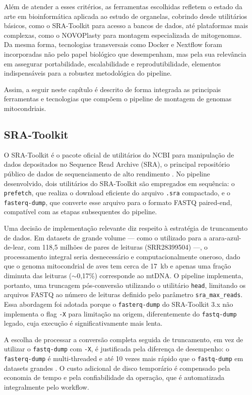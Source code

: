 Além de atender a esses critérios, as ferramentas escolhidas refletem o estado da arte em bioinformática aplicada ao estudo de organelas, cobrindo desde utilitários básicos, como o SRA-Toolkit para acesso a bancos de dados, até plataformas mais complexas, como o NOVOPlasty para montagem especializada de mitogenomas. Da mesma forma, tecnologias transversais como Docker e Nextflow foram incorporadas não pelo papel biológico que desempenham, mas pela sua relevância em assegurar portabilidade, escalabilidade e reprodutibilidade, elementos indispensáveis para a robustez metodológica do pipeline.

Assim, a seguir neste capítulo é descrito de forma integrada as principais ferramentas e tecnologias que compõem o pipeline de montagem de genomas mitocondriais.

\subsection{SRA-Toolkit}

O SRA-Toolkit é o pacote oficial de utilitários do NCBI para manipulação de dados depositados no Sequence Read Archive (SRA), o principal repositório público de dados de sequenciamento de alto rendimento \cite{leinonen2011}. No pipeline desenvolvido, dois utilitários do SRA-Toolkit são empregados em sequência: o \texttt{prefetch}, que realiza o download eficiente do arquivo \texttt{.sra} compactado, e o \texttt{fasterq-dump}, que converte esse arquivo para o formato FASTQ paired-end, compatível com as etapas subsequentes do pipeline.

Uma decisão de implementação relevante diz respeito à estratégia de truncamento de dados. Em datasets de grande volume --- como o utilizado para a arara-azul-de-lear, com 118,5 milhões de pares de leituras (SRR28399504) ---, o processamento integral seria desnecessário e computacionalmente oneroso, dado que o genoma mitocondrial de aves tem cerca de 17~kb e apenas uma fração diminuta das leituras ($\sim$0,17\%) corresponde ao mtDNA. O pipeline implementa, portanto, uma truncagem pós-conversão utilizando o utilitário \texttt{head}, limitando os arquivos FASTQ ao número de leituras definido pelo parâmetro \texttt{sra\_max\_reads}. Essa abordagem foi adotada porque o \texttt{fasterq-dump} do SRA-Toolkit 3.x não implementa o flag \texttt{-X} para limitação na origem, diferentemente do \texttt{fastq-dump} legado, cuja execução é significativamente mais lenta.

A escolha de processar a conversão completa seguida de truncamento, em vez de utilizar o \texttt{fastq-dump} com \texttt{-X}, é justificada pela diferença de desempenho: o \texttt{fasterq-dump} é multi-threaded e até 10 vezes mais rápido que o \texttt{fastq-dump} em datasets grandes \cite{ncbi2023}. O custo adicional de disco temporário é compensado pela economia de tempo e pela confiabilidade da operação, que é automatizada integralmente pelo workflow.

